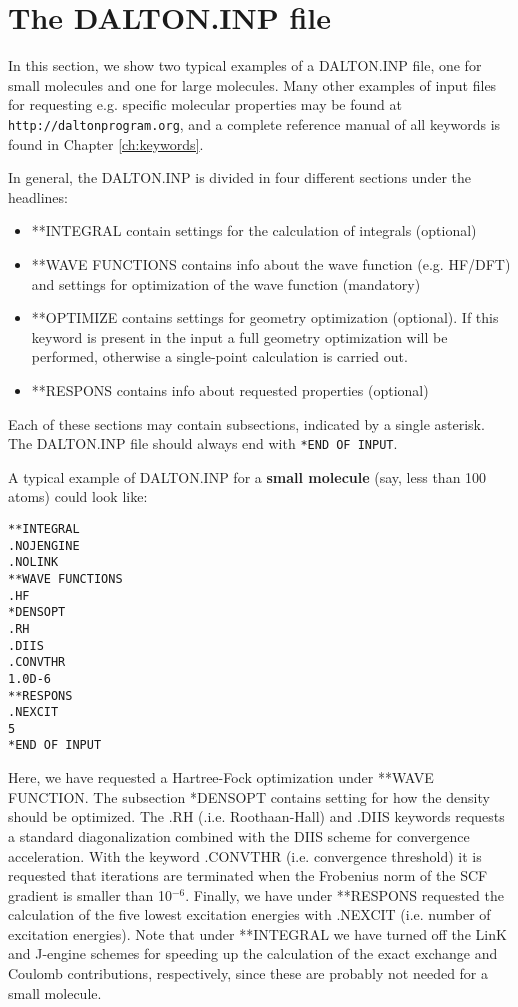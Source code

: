 \section{The DALTON.INP file}\label{sec:daltoninp}
In this section, we show two typical examples of a DALTON.INP file, one
for small molecules and one for large molecules. Many other examples
of input files for requesting e.g. specific molecular properties may be found
at \verb|http://daltonprogram.org|, and
a complete reference manual of all keywords is found in Chapter \ref{ch:keywords}.

In general, the DALTON.INP is divided in four different sections under
the headlines:
\begin{itemize}
\item **INTEGRAL contain settings for the calculation of integrals (optional)
\item **WAVE FUNCTIONS contains info about the wave function (e.g. HF/DFT) and settings
for optimization of the wave function (mandatory)
\item **OPTIMIZE contains settings for geometry optimization (optional). If this keyword
      is present in the input a full geometry optimization will be performed, otherwise a single-point 
      calculation is carried out.
\item **RESPONS contains info about requested properties (optional)
\end{itemize}
Each of these sections may contain subsections, indicated by a single asterisk.
The DALTON.INP file should always end with \verb|*END OF INPUT|. 

A typical example of DALTON.INP for a {\bf small molecule} (say, less than 100 atoms) could look like:
\begin{verbatim}
**INTEGRAL
.NOJENGINE
.NOLINK
**WAVE FUNCTIONS
.HF
*DENSOPT
.RH
.DIIS
.CONVTHR
1.0D-6
**RESPONS
.NEXCIT
5
*END OF INPUT
\end{verbatim}
Here, we have requested a Hartree-Fock optimization under **WAVE FUNCTION. The subsection
*DENSOPT contains setting for how the density should be optimized. The .RH (.i.e. Roothaan-Hall)
and .DIIS keywords requests a standard diagonalization combined with the DIIS scheme for convergence
acceleration. With the keyword .CONVTHR (i.e. convergence threshold) 
it is requested that iterations are terminated when the 
Frobenius norm of the SCF gradient is smaller than 10$^{-6}$. Finally, we have under **RESPONS requested
the calculation of the five lowest excitation energies with .NEXCIT (i.e. number of excitation energies).
Note that under **INTEGRAL we have turned off the LinK and J-engine schemes for speeding up the calculation
of the exact exchange and Coulomb contributions, respectively, since these are probably not needed for a small
molecule.

